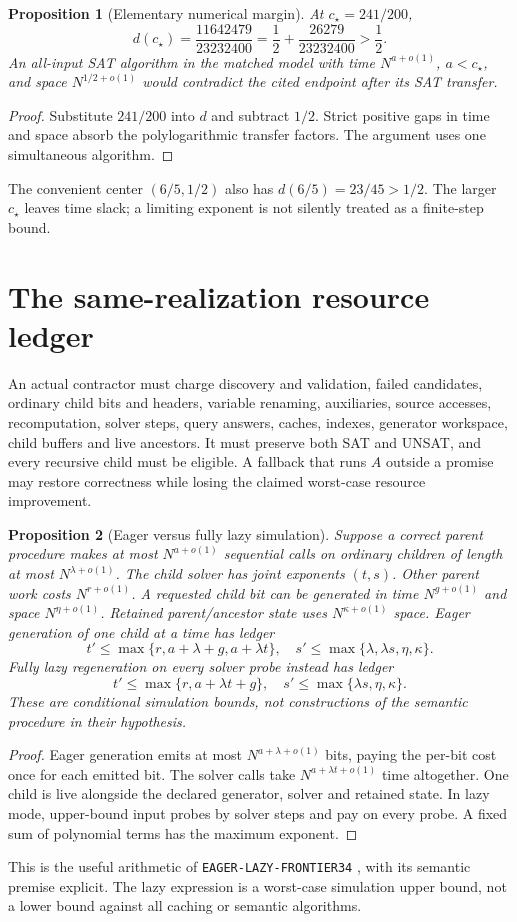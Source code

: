 \documentclass[11pt]{article}
\newtheorem{proposition}{Proposition}[section]
\begin{document}
\begin{proposition}[Elementary numerical margin]\label{prop:margin}
At $c_\star=241/200$,
\[
 d(c_\star)=\frac{11642479}{23232400}
 =\frac12+\frac{26279}{23232400}>\frac12.
\]
An all-input SAT algorithm in the matched model with time
$N^{a+o(1)}$, $a<c_\star$, and space $N^{1/2+o(1)}$ would contradict
the cited endpoint after its SAT transfer.
\end{proposition}
\begin{proof}
Substitute $241/200$ into $d$ and subtract $1/2$. Strict positive
gaps in time and space absorb the polylogarithmic transfer factors.
The argument uses one simultaneous algorithm.
\end{proof}
The convenient center $(6/5,1/2)$ also has
$d(6/5)=23/45>1/2$. The larger $c_\star$ leaves time slack;
a limiting exponent is not silently treated as a finite-step bound.

\section{The same-realization resource ledger}
An actual contractor must charge discovery and validation, failed candidates,
ordinary child bits and headers, variable renaming, auxiliaries, source
accesses, recomputation, solver steps, query answers, caches, indexes,
generator workspace, child buffers and live ancestors.
It must preserve both SAT and UNSAT, and every recursive child must be
eligible. A fallback that runs $A$ outside a promise may restore correctness
while losing the claimed worst-case resource improvement.

\begin{proposition}[Eager versus fully lazy simulation]\label{prop:ledger}
Suppose a \emph{correct} parent procedure makes at most $N^{a+o(1)}$
sequential calls on ordinary children of length at most
$N^{\lambda+o(1)}$. The child solver has joint exponents $(t,s)$.
Other parent work costs $N^{r+o(1)}$. A requested child bit can be
generated in time $N^{g+o(1)}$ and space $N^{\eta+o(1)}$.
Retained parent/ancestor state uses $N^{\kappa+o(1)}$ space.
Eager generation of one child at a time has ledger
\[
 t'\le\max\{r,a+\lambda+g,a+\lambda t\},\quad
 s'\le\max\{\lambda,\lambda s,\eta,\kappa\}.
\]
Fully lazy regeneration on every solver probe instead has ledger
\[
 t'\le\max\{r,a+\lambda t+g\},\quad
 s'\le\max\{\lambda s,\eta,\kappa\}.
\]
These are conditional simulation bounds, not constructions of the semantic
procedure in their hypothesis.
\end{proposition}
\begin{proof}
Eager generation emits at most $N^{a+\lambda+o(1)}$ bits, paying the
per-bit cost once for each emitted bit. The solver calls take
$N^{a+\lambda t+o(1)}$ time altogether. One child is live alongside
the declared generator, solver and retained state. In lazy mode,
upper-bound input probes by solver steps and pay on every probe.
A fixed sum of polynomial terms has the maximum exponent.
\end{proof}
This is the useful arithmetic of \texttt{EAGER-LAZY-FRONTIER34}
\cite{eager}, with its semantic premise explicit.
The lazy expression is a worst-case simulation upper bound, not a lower
bound against all caching or semantic algorithms.
\end{document}
